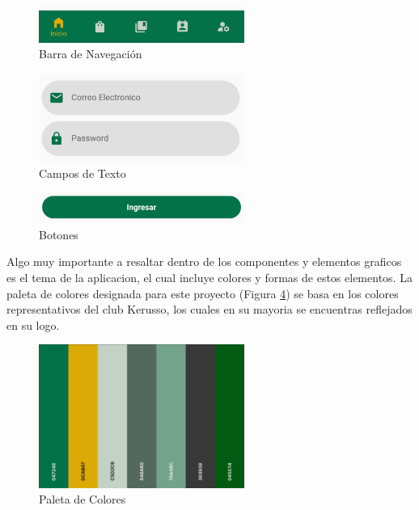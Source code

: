\documentclass[runningheads]{llncs}
\begin{document}
\begin{figure}[H]
	\centering\captionsetup{width=0.8\textwidth}
	\includegraphics[width=0.6\textwidth]{figures/graphic_components/barra_navegacion.png}
	\caption{Barra de Navegación} \label{fig7}
\end{figure}
\begin{figure}[H]
	\centering\captionsetup{width=0.8\textwidth}
	\includegraphics[width=0.6\textwidth]{figures/graphic_components/text_fields.png}
	\caption{Campos de Texto} \label{fig8}
\end{figure}
\begin{figure}[H]
	\centering\captionsetup{width=0.8\textwidth}
	\includegraphics[width=0.6\textwidth]{figures/graphic_components/button.png}
	\caption{Botones} \label{fig9}
\end{figure}

Algo muy importante a resaltar dentro de los componentes y elementos graficos es el tema de la aplicacion, el cual incluye colores y formas de estos elementos.
La paleta de colores designada para este proyecto (Figura \ref{fig10}) se basa en los colores representativos del club Kerusso, los cuales en su mayoria se encuentras reflejados en su logo.
\begin{figure}[H]
	\centering\captionsetup{width=0.8\textwidth}
	\includegraphics[width=0.6\textwidth]{figures/graphic_components/colors.png}
	\caption{Paleta de Colores} \label{fig10}
\end{figure}
\end{document}
